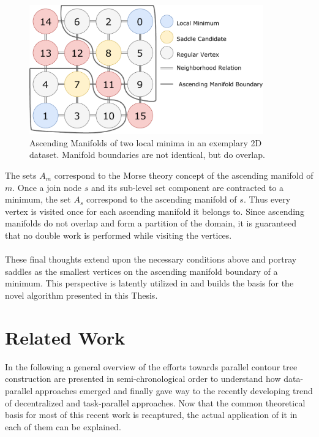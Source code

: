 \documentclass{scrartcl}
\begin{document}
\begin{figure}[h!]
\centering
\includegraphics[width=0.9\textwidth]{figures/AscendingManifold.pdf}
\caption{Ascending Manifolds of two local minima in an exemplary 2D dataset. Manifold boundaries are not identical, but do overlap.}
\label{fig:am}
\end{figure}
  
The sets \(A_m\) correspond to the Morse theory concept of the ascending manifold \cite{MorseSmale} of \(m\). Once a join node \(s\) and its sub-level set component are contracted to a minimum, the set \(A_s\) correspond to the ascending manifold of \(s\). Thus every vertex is visited once for each ascending manifold it belongs to. Since ascending manifolds do not overlap and form a partition of the domain, it is guaranteed that no double work is performed while visiting the vertices.

\paragraph{}
These final thoughts extend upon the necessary conditions above and portray saddles as the smallest vertices on the ascending manifold boundary of a minimum. This perspective is latently utilized in \cite{Carr} and builds the basis for the novel algorithm presented in this Thesis.

\section{Related Work}
In the following a general overview of the efforts towards parallel contour tree construction are presented in semi-chronological order to understand how data-parallel approaches emerged and finally gave way to the recently developing trend of decentralized and task-parallel approaches. Now that the common theoretical basis for most of this recent work is recaptured, the actual application of it in each of them can be explained.
\end{document}
